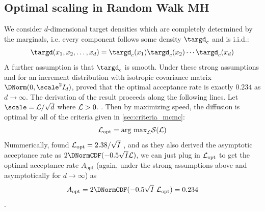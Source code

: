 \subsection{Optimal scaling in Random Walk MH}
We consider $d$-dimensional target densities which are completely determined by the marginals, i.e. every component follows some density $\targd_c$ and is i.i.d.:
\begin{equation}
\label{eq:factortarget}
\targd(x_1, x_2, \dots, x_d) = \targd_c(x_1)\targd_c(x_2)\cdots\targd_c(x_d)
\end{equation}
A further assumption is that $\targd_c$ is smooth. Under these strong assumptions and for an increment distribution with isotropic covariance matrix $\DNorm(0,\scale^2I_d)$, \cite{Roberts1997} proved that the optimal acceptance rate is  exactly $0.234$ as $d \rightarrow \infty$. The derivation of the result proceeds along the following lines. Let $\scale = \sfact/\sqrt{d}$ where $\mathcal{L}> 0$.  . Then by maximizing speed, the diffusion is optimal by all of the criteria given in \ref{sec:criteria_mcmc}:
$$\mathcal{L}_\textrm{opt} = \textrm{arg~max}_{\mathcal{L}} \mathcal{S}(\mathcal{L})$$
Nummerically, \cite{Roberts1997} found $\mathcal{L}_\textrm{opt} = 2.38/\sqrt{I}$ , and as they also derived the asymptotic acceptance rate as $2\DNormCDF(-0.5\sqrt{I}\sfact)$, we can just plug in $\mathcal{L}_\textrm{opt}$ to get the optimal acceptance rate $A_\textrm{opt}$ (again, under the strong assumptions above and asymptotically for $d \rightarrow \infty$) as  $$A_\textrm{opt} = 2\DNormCDF(-0.5\sqrt{I}~\sfact_\textrm{opt}) = 0.234$$.


